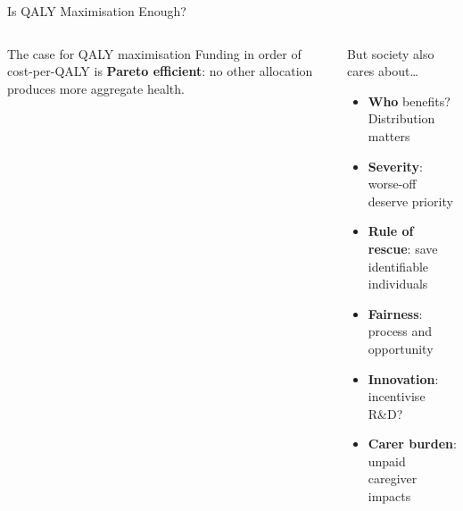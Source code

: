 \documentclass[aspectratio=169, 12pt]{beamer}
\begin{document}
\begin{frame}{Is QALY Maximisation Enough?}
  \begin{columns}
      \begin{block}{The case for QALY maximisation}
        \small Funding in order of cost-per-QALY is \textbf{Pareto efficient}: no other allocation produces more aggregate health.
      \end{block}
      \begin{alertblock}{But society also cares about\ldots}
        \footnotesize
        \begin{itemize}
          \item \textbf{Who} benefits? Distribution matters
          \item \textbf{Severity}: worse-off deserve priority
          \item \textbf{Rule of rescue}: save identifiable individuals
          \item \textbf{Fairness}: process and opportunity
          \item \textbf{Innovation}: incentivise R\&D?
          \item \textbf{Carer burden}: unpaid caregiver impacts
        \end{itemize}
      \end{alertblock}
  \end{columns}
\end{frame}
\end{document}
